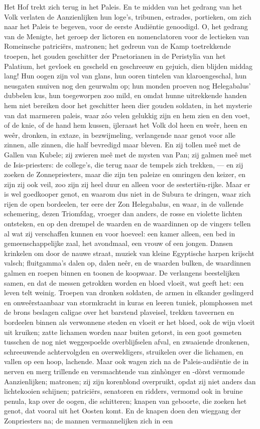 \documentclass[a4paper, 12pt, oneside, dutch]{article}
\begin{document}
Het Hof trekt zich terug in het Paleis. En te midden van het gedrang van het Volk verlaten de Aanzienlijken hun loge's, tribunen, estrades, portieken, om zich naar het Paleis te begeven, voor de eerste Audiëntie genoodigd. O, het gedrang van de Menigte, het geroep der lictoren en nomenclatoren voor de lectieken van Romeinsche patriciërs, matronen; het gedreun van de Kamp toetrekkende troepen, het gouden geschitter der Praetorianen in de Peristylia van het Palatium, het gevloek en gescheld en geschreeuw en gejuich, dien blijden middag lang! Hun oogen zijn vol van glans, hun ooren tintelen van klaroengeschal, hun neusgaten snuiven nog den geurwalm op; hun monden proeven nog Helegabalus' dubbelen kus, hun toegeworpen zoo mild, en omdat hunne uitrekkende handen hem niet bereiken door het geschitter heen dier gouden soldaten, in het mysterie van dat marmeren paleis, waar zóo velen gelukkig zijn en hem zien en den voet, of de knie, of de hand hem kussen, ijleraast het Volk dol heen en weêr, heen en weêr, dronken, in extaze, in bezwijmeling, verlangende naar genot voor alle zinnen, alle zinnen, die half bevredigd maar bleven. En zij tollen meê met de Gallen van Kubele; zij zwieren meê met de mysten van Pan; zij galmen meê met de Isis-priesters: de college's, die terug naar de tempels zich trekken, --- en zij zoeken de Zonnepriesters, maar die zijn ten paleize en omringen den keizer, en zijn zij ook veil, zoo zijn zij heel duur en alleen voor de sestertiën-rijke. Maar er is wel goedkooper genot, en waarom dus niet in de Subura te dringen, waar zich rijen de open bordeelen, ter eere der Zon Helegabalus, en waar, in de vallende schemering, dezen Triomfdag, vroeger dan anders, de rosse en violette lichten ontsteken, en op den drempel de waarden en de waardinnen op de vingers tellen al wat zij verschaffen kunnen en voor hoeveel: een kamer alleen, een bed in gemeenschappelijke zaal, het avondmaal, een vrouw of een jongen. Dansen krinkelen om door de nauwe straat, muziek van kleine Egyptische harpen krijscht valsch; fluitgamma's dalen op, dalen neêr, en de waarden bulken, de waardinnen galmen en roepen binnen en toonen de koopwaar. De verlangens beestelijken samen, en dat de messen getrokken worden en bloed vloeit, wat geeft het: een leven telt weinig. Troepen van dronken soldaten, de armen in elkander geslingerd en onweêrstaanbaar van stormkracht in kuras en leeren tuniek, plomphossen met de brons beslagen caligae over het barstend plaveisel, trekken taveernen en bordeelen binnen als verwonnene steden en vloeit er het bloed, ook de wijn vloeit uit kruiken; zatte lichamen worden naar buiten getorst, in een goot gesmeten tusschen de nog niet weggespoelde overblijfselen afval, en zwaaiende dronkenen, schreeuwende achtervolgden en overweldigers, struikelen over die lichamen, en vallen op een hoop, lachende. Maar ook wagen zich na de Paleis-audiëntie de in nerven en merg trillende en versmachtende van zinhònger en -dòrst vermomde Aanzienlijken; matronen; zij zijn korenblond overpruikt, opdat zij niet anders dan lichtekooien schijnen; patriciërs, senatoren en ridders, vermomd ook in bruine penula, kap over de oogen, die schitteren; knapen van geboorte, die zoeken het genot, dat vooral uit het Oosten komt. En de knapen doen den wieggang der Zonpriesters na; de mannen vermannelijken zich in een 
\end{document}
